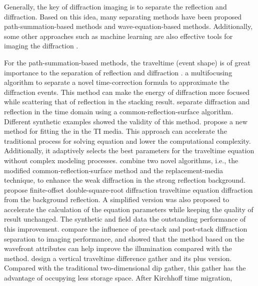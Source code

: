 Generally, the key of diffraction imaging is to  separate the reflection and diffraction. Based on this idea, many separating methods have been proposed  path-summation-based methods and  wave-equation-based methods.  Additionally, some other approaches such as machine learning \cite[]{Tschannen2020dp} are also effective tools for imaging the diffraction \cite[]{Protasov2019spectral}.

For the path-summation-based methods, the traveltime (event shape) is of great importance to the separation of reflection and diffraction \cite[]{Kanasewich1988dis,Santos2012Tomo}. \cite{Berkovitch2009multi}  a multifocusing algorithm to separate  a novel time-correction formula to approximate the diffraction events. This method can make the energy of diffraction more focused while scattering that of reflection in the stacking result. \cite{Dell2011crs} separate diffraction and reflection  in the time domain using a common-reflection-surface algorithm. Different synthetic examples showed the validity of this method. \cite{Waheed2013ti} propose a new method for fitting the  in the TI media. This approach can accelerate the traditional process for solving equation and lower the computational complexity. Additionally, it adaptively selects the best parameters for the traveltime equation without complex modeling processes. \cite{Asgedom2013co} combine two novel algorithms, i.e., the modified common‐reflection‐surface method and the replacement‐media technique, to enhance the weak diffraction in the strong reflection background. \cite{Coimbra2018fo} propose   finite-offset double-square-root diffraction traveltime equation diffraction from the background reflection. A simplified version was also proposed to accelerate the calculation of the equation parameters while keeping the quality of result unchanged. The synthetic and field data   the outstanding performance of this improvement. \cite{bakhtiari2018common} compare the influence of pre-stack and post-stack diffraction separation to imaging performance, and showed that the  method based on the wavefront attributes can help improve the illumination compared with the  method.  \cite{Zhengwei2019vtd} design a vertical traveltime difference gather and its plus version. Compared with the traditional two-dimensional dip gather, this gather has the advantage of occupying less storage space. After Kirchhoff time migration, 
